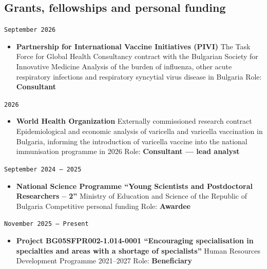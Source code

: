 \documentclass[
  10.5pt,
  a4paper,
  DIV=11,
  numbers=noendperiod]{scrartcl}
\providecommand{\tightlist}{%
  \setlength{\itemsep}{0pt}\setlength{\parskip}{0pt}}
\let\oldtexttt\texttt
\renewcommand{\texttt}[1]{{\color{cvbronze}\small\oldtexttt{#1}}}
\begin{document}
\subsection{Grants, fellowships and personal
funding}\label{grants-fellowships-and-personal-funding}

\texttt{September\ 2026}

\begin{itemize}
\tightlist
\item
  \textbf{Partnership for International Vaccine Initiatives (PIVI)}
  \textbar{} The Task Force for Global Health \textbar{} Consultancy
  contract with the Bulgarian Society for Innovative Medicine \textbar{}
  Analysis of the burden of influenza, other acute respiratory
  infections and respiratory syncytial virus disease in Bulgaria
  \textbar{} Role: \textbf{Consultant}
\end{itemize}

\texttt{2026}

\begin{itemize}
\tightlist
\item
  \textbf{World Health Organization} \textbar{} Externally commissioned
  research contract \textbar{} Epidemiological and economic analysis of
  varicella and varicella vaccination in Bulgaria, informing the
  introduction of varicella vaccine into the national immunisation
  programme in 2026 \textbar{} Role: \textbf{Consultant --- lead
  analyst}
\end{itemize}

\texttt{September\ 2024\ –\ 2025}

\begin{itemize}
\tightlist
\item
  \textbf{National Science Programme ``Young Scientists and Postdoctoral
  Researchers -- 2''} \textbar{} Ministry of Education and Science of
  the Republic of Bulgaria \textbar{} Competitive personal funding
  \textbar{} Role: \textbf{Awardee}
\end{itemize}

\texttt{November\ 2025\ –\ Present}

\begin{itemize}
\tightlist
\item
  \textbf{Project BG05SFPR002-1.014-0001 ``Encouraging specialisation in
  specialties and areas with a shortage of specialists''} \textbar{}
  Human Resources Development Programme 2021--2027 \textbar{} Role:
  \textbf{Beneficiary}
\end{itemize}
\end{document}
